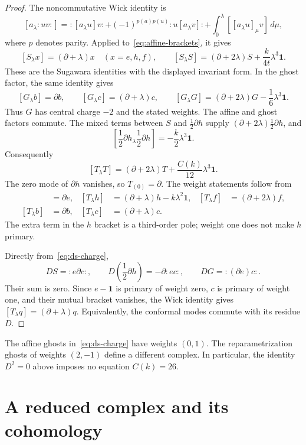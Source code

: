 \begin{proof}
The noncommutative Wick identity is
\[
 [a_\lambda:uv:]=:[a_\lambda u]v:
 +(-1)^{p(a)p(u)}:u[a_\lambda v]:
 +\int_0^\lambda [[a_\lambda u]_\mu v]\,d\mu,
\]
where $p$ denotes parity.
Applied to~\eqref{eq:affine-brackets}, it gives
\[
 [S_\lambda x]=(\partial+\lambda)x\quad(x=e,h,f),
 \qquad [S_\lambda S]=(\partial+2\lambda)S+\frac{k}{4t}\lambda^3\mathbf1.
\]
These are the Sugawara identities with the displayed invariant form.
In the ghost factor, the same identity gives
\[
 [G_\lambda b]=\partial b,
 \qquad [G_\lambda c]=(\partial+\lambda)c,
 \qquad [G_\lambda G]=(\partial+2\lambda)G-\frac16\lambda^3\mathbf1.
\]
Thus $G$ has central charge $-2$ and the stated weights.
The affine and ghost factors commute.
The mixed terms between $S$ and $\frac12\partial h$ supply
$(\partial+2\lambda)\frac12\partial h$, and
\[
 \left[\frac12\partial h{}_\lambda\frac12\partial h\right]
 =-\frac{k}{2}\lambda^3\mathbf1.
\]
Consequently
\begin{equation}\label{eq:TT}
 [T_\lambda T]=(\partial+2\lambda)T+\frac{C(k)}{12}\lambda^3\mathbf1.
\end{equation}
The zero mode of $\partial h$ vanishes, so $T_{(0)}=\partial$.
The weight statements follow from
\begin{align*}
 [T_\lambda e]&=\partial e,&
 [T_\lambda h]&=(\partial+\lambda)h-k\lambda^2\mathbf1,&
 [T_\lambda f]&=(\partial+2\lambda)f,\\
 [T_\lambda b]&=\partial b,&
 [T_\lambda c]&=(\partial+\lambda)c.
\end{align*}
The extra term in the $h$ bracket is a third-order pole; weight one does not make $h$ primary.

Directly from~\eqref{eq:ds-charge},
\[
 DS=:e\partial c:,
 \qquad D\left(\frac12\partial h\right)=-\partial:ec:,
 \qquad DG=:(\partial e)c:.
\]
Their sum is zero.
Since $e-\mathbf1$ is primary of weight zero, $c$ is primary of weight one, and their mutual bracket vanishes, the Wick identity gives
$[T_\lambda q]=(\partial+\lambda)q$.
Equivalently, the conformal modes commute with its residue $D$.
\end{proof}

The affine ghosts in~\eqref{eq:ds-charge} have weights $(0,1)$.
The reparametrization ghosts of weights $(2,-1)$ define a different complex.
In particular, the identity $D^2=0$ above imposes no equation $C(k)=26$.

\section{A reduced complex and its cohomology}

